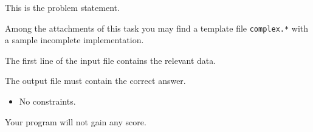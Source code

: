 \usepackage{xcolor}
\usepackage{caption}
\usepackage{afterpage}
\usepackage{pifont,mdframed}
\usepackage[bottom]{footmisc}


This is the problem statement.

\begin{warning}
    Among the attachments of this task you may find a template file \texttt{complex.*} with a sample incomplete implementation.
\end{warning}


\InputFile

The first line of the input file contains the relevant data.


\OutputFile

The output file must contain the correct answer.


\Constraints

\begin{itemize}[nolistsep, itemsep=2mm]
    \item No constraints.
\end{itemize}

\Scoring

Your program will not gain any score.
